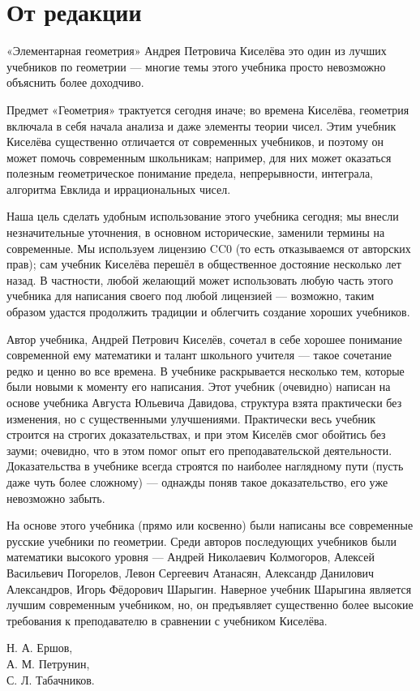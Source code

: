 \section*{От редакции}


«Элементарная геометрия» Андрея Петровича Киселёва это один из лучших учебников по геометрии ---
многие темы этого учебника просто невозможно объяснить более доходчиво.

Предмет «Геометрия» трактуется сегодня иначе;
во времена Киселёва, геометрия включала в себя начала анализа и даже элементы теории чисел.
Этим учебник Киселёва существенно отличается от современных учебников, и поэтому он может помочь современным школьникам;
например, для них может оказаться полезным геометрическое понимание предела, непрерывности, интеграла, алгоритма Евклида и иррациональных чисел.

Наша цель сделать удобным использование этого учебника сегодня;
мы внесли незначительные уточнения, в основном исторические, заменили термины на современные. 
Мы используем лицензию CC0 (то есть отказываемся от авторских прав); сам учебник Киселёва перешёл в общественное достояние несколько лет назад.
В частности, любой желающий может использовать любую часть этого учебника для написания своего под любой лицензией ---
возможно, таким образом удастся продолжить традиции и облегчить создание хороших учебников. 

Автор учебника, Андрей Петрович Киселёв, сочетал в себе хорошее понимание современной ему математики и талант школьного учителя --- такое сочетание редко и ценно во все времена.
В учебнике раскрывается несколько тем, которые были новыми к моменту его написания. 
Этот учебник (очевидно) написан на основе учебника Августа Юльевича Давидова, структура взята практически без изменения, но с существенными улучшениями.
Практически весь учебник строится на строгих доказательствах, и при этом Киселёв смог обойтись без зауми;
очевидно, что в этом помог опыт его преподавательской деятельности.
Доказательства в учебнике всегда строятся по наиболее наглядному пути (пусть даже чуть более сложному) --- однажды поняв такое доказательство, его уже невозможно забыть. 

На основе этого учебника (прямо или косвенно) были написаны все современные русские учебники по геометрии.
Среди авторов последующих учебников были математики высокого уровня --- Андрей Николаевич Колмогоров, Алексей Васильевич Погорелов, Левон Сергеевич Атанасян,  Александр Данилович Александров, Игорь Фёдорович Шарыгин.
Наверное учебник Шарыгина является лучшим современным учебником, но, он предъявляет существенно более высокие требования к преподавателю в сравнении с учебником Киселёва.


\begin{flushright}
Н. А. Ершов,\\ 
А. М. Петрунин,\\ 
С. Л. Табачников.        
\end{flushright}
\clearpage
